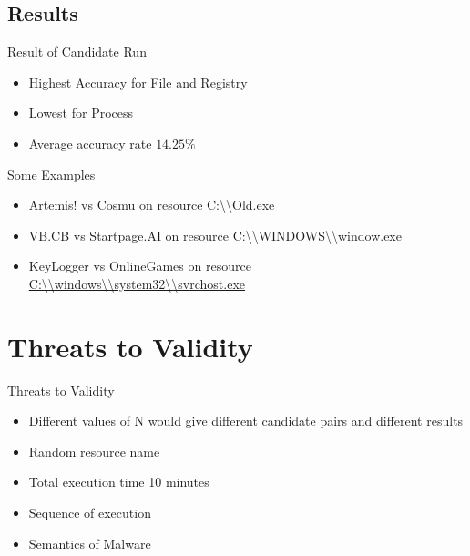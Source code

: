 \documentclass[]{beamer}
\begin{document}
\subsection{Results}
\label{sub:Results}
\begin{frame}[t]{Result of Candidate Run}
\begin{itemize}
  \item Highest Accuracy for File and Registry
  \item Lowest for Process
  \item Average accuracy rate $14.25\%$
\end{itemize}
\end{frame}
\begin{frame}{Some Examples}
  \begin{itemize}
    \item Artemis! vs Cosmu on resource \url{C:\\Old.exe}
    \item VB.CB vs Startpage.AI on resource \url{C:\\WINDOWS\\window.exe}
    \item KeyLogger vs OnlineGames on resource \url{C:\\windows\\system32\\svrchost.exe}
  \end{itemize}
  
\end{frame}
\section{Threats to Validity}
\begin{frame}{Threats to Validity}
  \begin{itemize}
    \item Different values of N would give different candidate pairs and different results
    \item Random resource name
    \item Total execution time 10 minutes
    \item Sequence of execution
    \item Semantics of Malware
  \end{itemize}
\end{frame}
\end{document}

